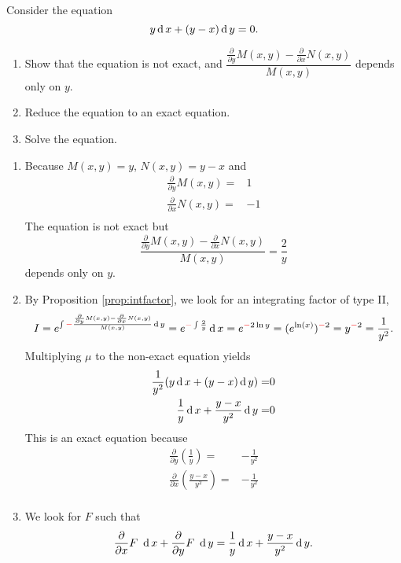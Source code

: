 \begin{example}
	Consider the equation
	\[y \operatorname{d} x+ (y-x) \operatorname{d} y  =0. \]
	\begin{enumerate}
		\item  Show that the equation is not exact, and $\dfrac{\frac{\partial}{\partial y} M(x,y) - \frac{\partial}{\partial x} N(x,y)}{M(x,y)}$ depends only on $y$.
		\item Reduce the equation to an exact equation.
		\item Solve the equation.
	\end{enumerate}
\end{example}
\begin{solution}
	\begin{enumerate}
		\item Because $M(x, y)=y$, $N(x, y)=y-x$ and 
		\[
		\begin{split}
		\frac{\partial}{\partial y} M(x, y) =&1 \\
		\frac{\partial}{\partial x} N(x, y) =&-1 \\
		\end{split}
		\]
		The equation is not exact but
		\[ \frac{\frac{\partial}{\partial y} M(x,y) - \frac{\partial}{\partial x} N(x,y)}{M(x,y)}=  \frac{2}{y}\] 
		depends only on $y$.
		\item By Proposition \ref{prop:intfactor}, 
			we look for an integrating factor of type II,
		\[I= e^{\int {\color{red}-}\frac{\frac{\partial}{\partial y} M(x,y) - \frac{\partial}{\partial x} N(x,y)}{M(x,y)}\operatorname{d} y} = e^{{\color{red}-}\int\frac{2}{y}} \operatorname{d} x=e^{{\color{red}-}2\ln y}=(e^{\ln(x)})^{{\color{red}-}2}=y^{{\color{red}-}2}=\frac{1}{y^2}. \]
		Multiplying $\mu$ to the non-exact equation yields
		\[
      \begin{aligned}
        \frac{1}{y^2} (y  \operatorname{d} x + (y-x)\operatorname{d} y)=&0\\
        \frac{1}{y}  \operatorname{d} x+\frac{y-x}{y^2} \operatorname{d} y  =& 0
      \end{aligned}
      \]
		This is an exact equation because
		\[
		\begin{split}
		\frac{\partial}{\partial y}\left(\frac{1}{y}\right) =&-\frac{1}{y^2} \\
		\frac{\partial}{\partial x}\left(\frac{y-x}{y^2}\right)=&-\frac{1}{y^2} \\
		\end{split}
		\]
		\item We look for $F$ such that 
		\[\frac{\partial}{\partial x} F  ~\operatorname{d} x+\frac{\partial}{\partial y} F ~\operatorname{d} y=  \frac{1}{y} \operatorname{d} x+\frac{y-x}{y^2} \operatorname{d} y.\]

\end{enumerate}
\end{solution}
